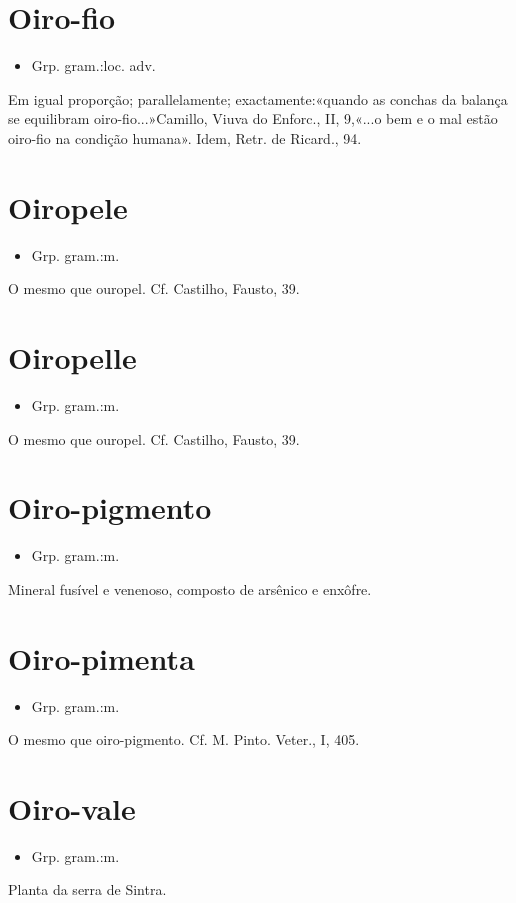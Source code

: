 \section{Oiro-fio}
\begin{itemize}
\item {Grp. gram.:loc. adv.}
\end{itemize}
Em igual proporção; parallelamente; exactamente:«\textunderscore quando as conchas da balança se equilibram oiro-fio...\textunderscore »Camillo, \textunderscore Viuva do Enforc.\textunderscore , II, 9,«\textunderscore ...o bem e o mal estão oiro-fio na condição humana\textunderscore ». Idem, \textunderscore Retr. de Ricard.\textunderscore , 94.
\section{Oiropele}
\begin{itemize}
\item {Grp. gram.:m.}
\end{itemize}
O mesmo que \textunderscore ouropel\textunderscore . Cf. Castilho, \textunderscore Fausto\textunderscore , 39.
\section{Oiropelle}
\begin{itemize}
\item {Grp. gram.:m.}
\end{itemize}
O mesmo que \textunderscore ouropel\textunderscore . Cf. Castilho, \textunderscore Fausto\textunderscore , 39.
\section{Oiro-pigmento}
\begin{itemize}
\item {Grp. gram.:m.}
\end{itemize}
Mineral fusível e venenoso, composto de arsênico e enxôfre.
\section{Oiro-pimenta}
\begin{itemize}
\item {Grp. gram.:m.}
\end{itemize}
O mesmo que \textunderscore oiro-pigmento\textunderscore . Cf. M. Pinto. \textunderscore Veter.\textunderscore , I, 405.
\section{Oiro-vale}
\begin{itemize}
\item {Grp. gram.:m.}
\end{itemize}
Planta da serra de Sintra.
